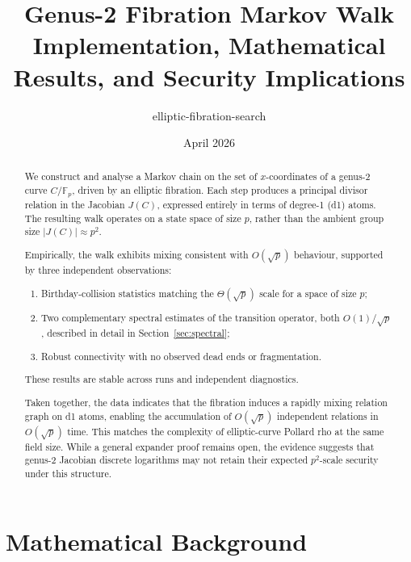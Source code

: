 \documentclass[11pt]{article}
\title{\textbf{Genus-2 Fibration Markov Walk}\\[4pt]
       \large Implementation, Mathematical Results, and Security Implications}
\author{elliptic-fibration-search}
\date{April 2026}
\theoremstyle{definition}
\theoremstyle{remark}
\newcommand{\Fp}{\mathbb{F}_p}
\newcommand{\BigO}[1]{O\!\left(#1\right)}
\begin{document}
\maketitle

\begin{abstract}
We construct and analyse a Markov chain on the set of $x$-coordinates of a
genus-2 curve $C/\Fp$, driven by an elliptic fibration. Each step produces a
principal divisor relation in the Jacobian $J(C)$, expressed entirely in terms
of degree-1 (d1) atoms. The resulting walk operates on a state space of size
$p$, rather than the ambient group size $|J(C)| \approx p^2$.

Empirically, the walk exhibits mixing consistent with $\BigO{\sqrt{p}}$
behaviour, supported by three independent observations:
\begin{enumerate}
  \item Birthday-collision statistics matching the $\Theta(\sqrt{p})$ scale for
        a space of size $p$;
  \item Two complementary spectral estimates of the transition operator, both
        $\BigO{1}/\sqrt{p}$, described in detail in Section~\ref{sec:spectral};
  \item Robust connectivity with no observed dead ends or fragmentation.
\end{enumerate}
These results are stable across runs and independent diagnostics.

Taken together, the data indicates that the fibration induces a rapidly mixing
relation graph on d1 atoms, enabling the accumulation of $\BigO{\sqrt{p}}$
independent relations in $\BigO{\sqrt{p}}$ time. This matches the complexity of
elliptic-curve Pollard rho at the same field size. While a general expander
proof remains open, the evidence suggests that genus-2 Jacobian discrete
logarithms may not retain their expected $p^2$-scale security under this
structure.
\end{abstract}

\tableofcontents
\newpage

\section{Mathematical Background}
\label{sec:math}

\end{document}
